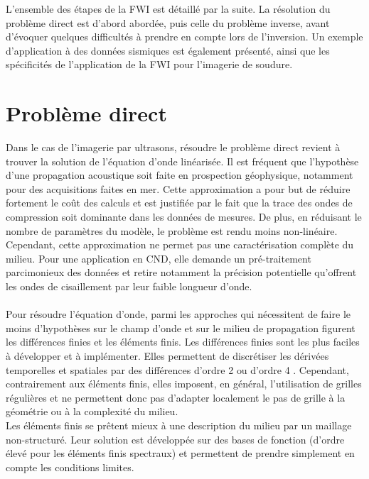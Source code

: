 L'ensemble des étapes de la FWI est détaillé par la suite. La résolution du problème direct est d'abord abordée, puis celle du problème inverse, avant d'évoquer quelques difficultés à prendre en compte lors de l'inversion. Un exemple d'application à des données sismiques est également présenté, ainsi que les spécificités de l'application de la FWI pour l'imagerie de soudure. \\



\section{Problème direct \label{pd_dir}}

Dans le cas de l'imagerie par ultrasons, résoudre le problème direct revient à trouver la solution de l'équation d'onde linéarisée. Il est fréquent que l'hypothèse d'une propagation acoustique soit faite en prospection géophysique, notamment pour des acquisitions faites en mer. Cette approximation a pour but de réduire fortement le coût des calculs et est justifiée par le fait que la trace des ondes de compression soit dominante dans les données de mesures. De plus, en réduisant le nombre de paramètres du modèle, le problème est rendu moins non-linéaire. Cependant, cette approximation ne permet pas une caractérisation complète du milieu. Pour une application en CND, elle demande un pré-traitement parcimonieux des données et retire notamment la précision potentielle qu'offrent les ondes de cisaillement par leur faible longueur d'onde.\\~\\




 Pour résoudre l'équation d'onde, parmi les approches qui nécessitent de faire le moins d'hypothèses sur le champ d'onde et sur le milieu de propagation figurent les différences finies et les éléments finis. Les différences finies sont les plus faciles à développer et à implémenter. Elles permettent de discrétiser les dérivées temporelles et spatiales par des différences d'ordre 2 \citep{virieux_86} ou d'ordre 4 \citep{levander}. Cependant, contrairement aux éléments finis, elles imposent, en général, l'utilisation de grilles régulières et ne permettent donc pas d'adapter localement le pas de grille à la géométrie ou à la complexité du milieu. \\ Les éléments finis se prêtent mieux à une description du milieu par un maillage non-structuré. Leur solution est développée sur des bases de fonction (d'ordre élevé pour les éléments finis spectraux) et permettent de prendre simplement en compte les conditions limites.\\
 
